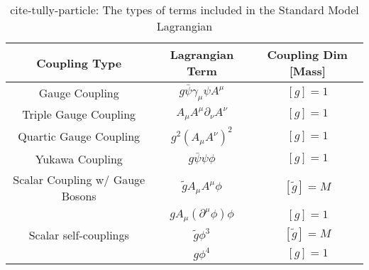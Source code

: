 \begin{center}
\begin{table}[]
\begin{center}
\caption{cite-tully-particle:  The types of terms included in the Standard Model Lagrangian }
\begin{tabular}{ccc}
Coupling Type & Lagrangian Term &  Coupling Dim [Mass]\\
\hline
Gauge Coupling & $g \bar \psi \gamma_\mu \psi A^\mu$ & $[g] = 1$ \\
Triple Gauge Coupling & $A_\mu A^\mu \partial_\nu A^\nu$ & $[g] = 1$ \\
Quartic Gauge Coupling & $g^2 (A_\mu A^\nu)^2$ & $[g] = 1$ \\
Yukawa Coupling & $g \bar \psi \psi \phi$ & $[g] = 1$ \\
Scalar Coupling w/ Gauge Bosons & $\tilde{g} A_\mu A^\mu \phi$ & $[\tilde{g}] = M$ \\
& $g A_\mu(\partial^\mu \phi) \phi$ & $[g] =1$\\
Scalar self-couplings & $\tilde{g}\phi^3$ & $[\tilde{g}] = M$ \\
& $g \phi^4$ & $[g] = 1$ 
\end{tabular}
\label{tab:interactions}
\end{center}
\end{table}
\end{center}
